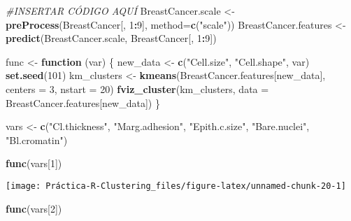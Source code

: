 \documentclass[
]{article}
\newenvironment{Shaded}{\begin{snugshade}}{\end{snugshade}}
\newcommand{\CommentTok}[1]{\textcolor[rgb]{0.56,0.35,0.01}{\textit{#1}}}
\newcommand{\ControlFlowTok}[1]{\textcolor[rgb]{0.13,0.29,0.53}{\textbf{#1}}}
\newcommand{\DataTypeTok}[1]{\textcolor[rgb]{0.13,0.29,0.53}{#1}}
\newcommand{\DecValTok}[1]{\textcolor[rgb]{0.00,0.00,0.81}{#1}}
\newcommand{\KeywordTok}[1]{\textcolor[rgb]{0.13,0.29,0.53}{\textbf{#1}}}
\newcommand{\NormalTok}[1]{#1}
\newcommand{\OperatorTok}[1]{\textcolor[rgb]{0.81,0.36,0.00}{\textbf{#1}}}
\newcommand{\StringTok}[1]{\textcolor[rgb]{0.31,0.60,0.02}{#1}}
\begin{document}
\begin{Shaded}
\begin{Highlighting}[]
\CommentTok{#INSERTAR CÓDIGO AQUÍ}
\NormalTok{BreastCancer.scale <-}\StringTok{ }\KeywordTok{preProcess}\NormalTok{(BreastCancer[, }\DecValTok{1}\OperatorTok{:}\DecValTok{9}\NormalTok{], }\DataTypeTok{method=}\KeywordTok{c}\NormalTok{(}\StringTok{"scale"}\NormalTok{))}
\NormalTok{BreastCancer.features <-}\StringTok{ }\KeywordTok{predict}\NormalTok{(BreastCancer.scale, BreastCancer[, }\DecValTok{1}\OperatorTok{:}\DecValTok{9}\NormalTok{])}

\NormalTok{func <-}\StringTok{ }\ControlFlowTok{function}\NormalTok{ (var) \{ }
\NormalTok{  new_data <-}\StringTok{ }\KeywordTok{c}\NormalTok{(}\StringTok{"Cell.size"}\NormalTok{, }\StringTok{"Cell.shape"}\NormalTok{, var)}
  \KeywordTok{set.seed}\NormalTok{(}\DecValTok{101}\NormalTok{)}
\NormalTok{  km_clusters <-}\StringTok{ }\KeywordTok{kmeans}\NormalTok{(BreastCancer.features[new_data], }\DataTypeTok{centers =} \DecValTok{3}\NormalTok{, }\DataTypeTok{nstart =} \DecValTok{20}\NormalTok{)}
  \KeywordTok{fviz_cluster}\NormalTok{(km_clusters, }\DataTypeTok{data =}\NormalTok{ BreastCancer.features[new_data])}
\NormalTok{\}}

\NormalTok{vars <-}\StringTok{ }\KeywordTok{c}\NormalTok{(}\StringTok{"Cl.thickness"}\NormalTok{, }\StringTok{"Marg.adhesion"}\NormalTok{, }\StringTok{"Epith.c.size"}\NormalTok{, }\StringTok{"Bare.nuclei"}\NormalTok{, }\StringTok{"Bl.cromatin"}\NormalTok{)}
\end{Highlighting}
\end{Shaded}

\newpage

\begin{Shaded}
\begin{Highlighting}[]
\KeywordTok{func}\NormalTok{(vars[}\DecValTok{1}\NormalTok{])}
\end{Highlighting}
\end{Shaded}

\begin{center}\texttt{[image: Práctica-R-Clustering\_files/figure-latex/unnamed-chunk-20-1]} \end{center}

\begin{Shaded}
\begin{Highlighting}[]
\KeywordTok{func}\NormalTok{(vars[}\DecValTok{2}\NormalTok{])}
\end{Highlighting}
\end{Shaded}
\end{document}
